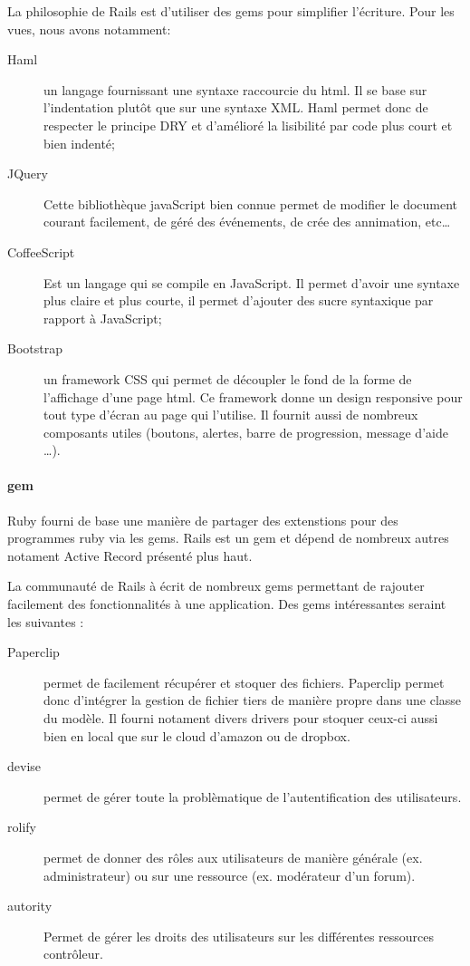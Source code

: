 La philosophie de Rails est d'utiliser des gems pour simplifier l'écriture. Pour les vues, nous avons notamment:
\begin{description}
  \item[Haml] un langage fournissant une syntaxe raccourcie du html. Il se base sur l'indentation plutôt que sur une syntaxe XML. Haml permet donc de respecter le principe DRY et d'amélioré la lisibilité par code plus court et bien indenté;
  \item[JQuery] Cette bibliothèque javaScript bien connue permet de modifier le document courant facilement, de géré des événements, de crée des annimation, etc\ldots
  \item[CoffeeScript] Est un langage qui se compile en JavaScript. Il permet d'avoir une syntaxe plus claire et plus courte, il permet d'ajouter des sucre syntaxique par rapport à JavaScript;
  \item[Bootstrap] un framework CSS qui permet de découpler le fond de la forme de l'affichage d'une page html. Ce framework donne un design responsive pour tout type d'écran au page qui l'utilise. Il fournit aussi de nombreux composants utiles (boutons, alertes, barre de progression, message d'aide \ldots).
\end{description}

\paragraph{gem}
Ruby fourni de base une manière de partager des extenstions pour des programmes ruby via les gems. Rails est un gem et dépend de nombreux autres notament Active Record présenté plus haut.

La communauté de Rails à écrit de nombreux gems permettant de rajouter facilement des fonctionnalités à une application. Des gems intéressantes seraint les suivantes :
\begin{description}
  \item[Paperclip] permet de facilement récupérer et stoquer des fichiers. Paperclip permet donc d'intégrer la gestion de fichier tiers de manière propre dans une classe du modèle. Il fourni notament divers drivers pour stoquer ceux-ci aussi bien en local que sur le cloud d'amazon ou de dropbox.
  \item[devise] permet de gérer toute la problèmatique de l'autentification des utilisateurs.
  \item[rolify] permet de donner des rôles aux utilisateurs de manière générale (ex. administrateur) ou sur une ressource (ex. modérateur d'un forum).
  \item[autority] Permet de gérer les droits des utilisateurs sur les différentes ressources contrôleur.
\end{description}

